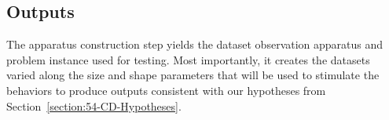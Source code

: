 

\subsection{Outputs}
The apparatus construction step yields the dataset observation apparatus and \gai problem instance used for testing. 
Most importantly, it creates the datasets varied along the size and shape parameters that will be used to stimulate the behaviors to produce outputs consistent with our hypotheses from Section~\ref{section:54-CD-Hypotheses}.




